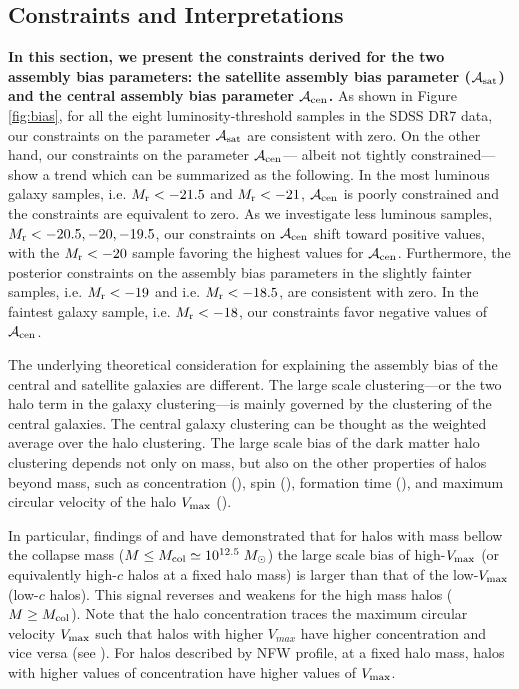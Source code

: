 \documentclass[twocolumn]{aastex61}
\newcommand{\acen}{\mathcal{A}_{\rm cen}}
\newcommand{\asat}{\mathcal{A}_{\rm sat}}
\begin{document}
\subsection{{\color{dred} Constraints and Interpretations}}
{\bf \color{dred}  
    In this section, we present the constraints derived for the two assembly 
    bias parameters: the satellite assembly bias parameter ($\asat$) and the 
    central assembly bias parameter $\acen$. 
} 
As shown in Figure \ref{fig:bias}, for all the eight luminosity-threshold samples in the SDSS DR7 data, our constraints on the parameter $\asat$ are 
consistent with zero. On the other hand, our constraints on the parameter $\acen$--- albeit not tightly constrained--- show a trend which can be summarized as the following. In the most luminous galaxy samples, i.e. $M_{\rm r} < -21.5$ and $M_{\rm r} < -21$, $\acen$ is poorly constrained and the constraints are equivalent to zero. As we investigate less luminous samples, $M_{\rm r} < -20.5 , -20, -19.5$, our constraints on $\acen$ shift toward positive values, with the $M_{\rm r}<-20$ sample favoring the highest values for $\acen$. Furthermore, the posterior constraints on the assembly bias parameters in the slightly fainter samples, i.e. $M_{\rm r} < -19$ and i.e. $M_{\rm r} < -18.5$, are consistent with zero. In the faintest galaxy sample, i.e. $M_{\rm r} < -18$, our constraints favor negative values of $\acen$.

The underlying theoretical consideration for explaining the assembly bias of the central 
and satellite galaxies are different. The large scale clustering---or the two halo term in the galaxy clustering---is mainly governed by the clustering of the central galaxies. The central galaxy clustering can be thought as the weighted average over the halo clustering. The large scale bias of the dark matter halo clustering depends not only on mass, but also on the other properties of halos beyond mass, such as concentration (\citealt{weschler2006,gao2007,miyatake2016}), spin (\citealt{gao2007}), formation time (\citealt{gao2007, li2008}), and maximum circular velocity of the halo $V_{\rm max}$ (\citealt{sunayama2016}).

In particular, findings of \citet{weschler2006} and \citet{sunayama2016}
have demonstrated that for halos with mass bellow the collapse mass ($M \leq M_{\rm col} \simeq 10^{12.5}\; M_{\odot} $) the large scale bias of high-$V_{\rm max}$ (or equivalently high-$c$ halos at a fixed halo mass) is larger than that of the low-$V_{\rm max}$ (low-$c$ halos). This signal reverses and weakens for the high mass halos ($M \geq M_{\rm col}$). Note that the halo concentration traces the maximum circular velocity $V_{\rm max}$ such that halos with higher $V_{max}$ have higher concentration and vice versa (see \citealt{prada2012}). For halos described by NFW profile, at a fixed halo mass, halos with higher values of concentration have higher values of $V_{\rm max}$.
\end{document}
